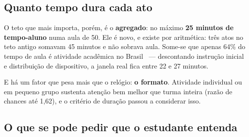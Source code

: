 \documentclass[11pt,a4paper]{article}
\begin{document}
\subsection{Quanto tempo dura cada ato}

\begin{center}
\begin{minipage}{\textwidth}\centering
{}
\end{minipage}
\end{center}

O teto que mais importa, porém, é o \textbf{agregado}: no máximo \textbf{25 minutos de tempo-aluno} numa aula de 50. Ele é novo, e existe por aritmética: três atos no teto antigo somavam 45 minutos e não sobrava aula. Some-se que apenas 64\% do tempo de aula é atividade acadêmica no Brasil~\cite{bruns2018} --- descontando instrução inicial e distribuição de dispositivo, a janela real fica entre 22 e 27 minutos.

E há um fator que pesa mais que o relógio: \textbf{o formato}. Atividade individual ou em pequeno grupo sustenta atenção bem melhor que turma inteira (razão de chances até 1,62), e o critério de duração passou a considerar isso.

\subsection{O que se pode pedir que o estudante entenda}
\end{document}
